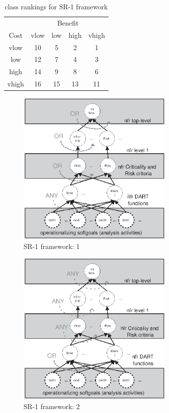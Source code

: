 \documentclass[twocolumn]{styles/IEEEtran}
\begin{document}
 \begin{table}[h]
 \begin{center}
 \begin{small}
 \begin{tabular}[t]{|c|cccc|} \hline
 & \multicolumn{4}{c|}{Benefit} \\ 
 Cost	& vlow 	& low 	& high 	& vhigh	\\ \hline
 vlow 	& 10 	& 5 	& 2 	& 1 	\\ 
 low 	& 12	& 7 	& 4 	& 3 	\\ 
 high 	& 14 	& 9 	& 8 	& 6 	\\ 
 vhigh 	& 16 	& 15 	& 13 	& 11 	\\ \hline
 \end{tabular}
 \end{small}
 \end{center}
 \caption{class rankings for SR-1 framework}
 \label{tab:cara_analysis}
 \end{table}

\begin{figure}[h]
\begin{center}
 \includegraphics[width=3in]{fig/or3a.eps}

\end{center}
\caption{SR-1 framework: 1}
\label{fig:cara_analysis_or3any}

\end{figure}

\begin{figure}[h]
\begin{center}
\includegraphics[width=3in]{fig/any3or.eps}

\end{center}
\caption{SR-1 framework: 2}
\label{fig:cara_analysis_any3or}
\end{figure}
\end{document}
